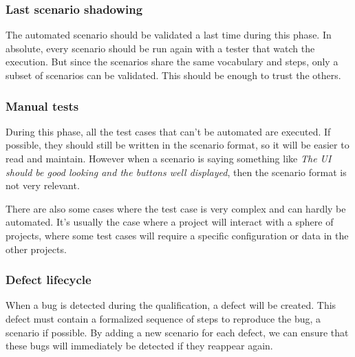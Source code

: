 \subsubsection{Last scenario shadowing}
The automated scenario should be validated a last time during this phase.
In absolute, every scenario should be run again with a tester that watch
the execution.
But since the scenarios share the same vocabulary and steps, only a subset of
scenarios can be validated.
This should be enough to trust the others.

\subsubsection{Manual tests}
During this phase, all the test cases that can't be automated are executed.
If possible, they should still be written in the scenario format, so it will
be easier to read and maintain.
However when a scenario is saying something like \textit{The UI should be good
looking and the buttons well displayed}, then the scenario format is not very
relevant.

There are also some cases where the test case is very complex and can hardly
be automated.
It's usually the case where a project will interact with a sphere of
projects, where some test cases will require a specific configuration or data
in the other projects.

\subsubsection{Defect lifecycle}
When a bug is detected during the qualification, a defect will be created.
This defect must contain a formalized sequence of steps to reproduce the bug,
a scenario if possible.
By adding a new scenario for each defect, we can ensure that these bugs will
immediately be detected if they reappear again.
